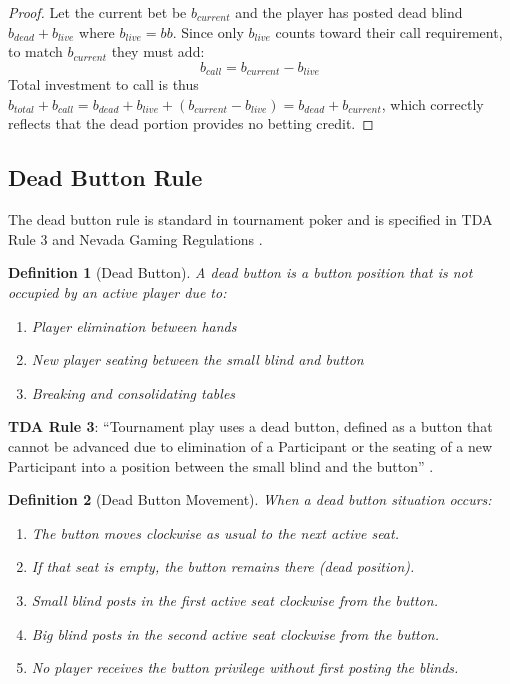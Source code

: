 \documentclass[11pt,a4paper]{article}
\newtheorem{definition}{Definition}[section]
\begin{document}
\begin{proof}
Let the current bet be $b_{current}$ and the player has posted dead blind $b_{dead} + b_{live}$ where $b_{live} = bb$. Since only $b_{live}$ counts toward their call requirement, to match $b_{current}$ they must add:
\[
b_{call} = b_{current} - b_{live}
\]
Total investment to call is thus $b_{total} + b_{call} = b_{dead} + b_{live} + (b_{current} - b_{live}) = b_{dead} + b_{current}$, which correctly reflects that the dead portion provides no betting credit.
\end{proof}

\subsection{Dead Button Rule}

The dead button rule is standard in tournament poker and is specified in TDA Rule 3 \cite{tda2024rules} and Nevada Gaming Regulations \cite{nevada2023gaming}.

\begin{definition}[Dead Button]
\label{def:dead-button}
A \emph{dead button} is a button position that is not occupied by an active player due to:
\begin{enumerate}
    \item Player elimination between hands
    \item New player seating between the small blind and button
    \item Breaking and consolidating tables
\end{enumerate}
\end{definition}

\textbf{TDA Rule 3}: ``Tournament play uses a dead button, defined as a button that cannot be advanced due to elimination of a Participant or the seating of a new Participant into a position between the small blind and the button'' \cite{tda2024rules}.

\begin{definition}[Dead Button Movement]
\label{def:dead-button-movement}
When a dead button situation occurs:
\begin{enumerate}
    \item The button moves clockwise as usual to the next active seat.
    \item If that seat is empty, the button remains there (dead position).
    \item Small blind posts in the first active seat clockwise from the button.
    \item Big blind posts in the second active seat clockwise from the button.
    \item No player receives the button privilege without first posting the blinds.
\end{enumerate}
\end{definition}
\end{document}
